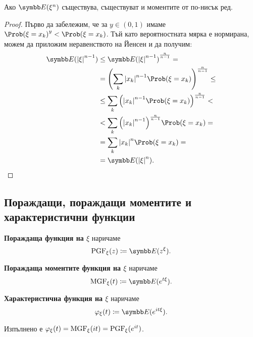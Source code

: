 \documentclass[numbers=endperiod, bibliography=totocnumbered]{scrartcl}
\begin{document}
\begin{proposition}\label{thm:lower_order_moments_exist}
  Ако \( \Expect(\xi^n) \) съществува, съществуват и моментите от по-нисък ред.
\end{proposition}
\begin{proof}
  Първо да забележим, че за \( y \in (0, 1) \) имаме \( {\Prob(\xi = x_k)}^y < \Prob(\xi = x_k) \). Тъй като вероятностната мярка е нормирана, можем да приложим неравенството на Йенсен и да получим:
  \begin{align*}
    \Expect({\Abs{\xi}}^{n-1})
    &\leq
    {\Expect({\Abs{\xi}}^{n-1})}^{\frac n {n-1}}
    = \\ &=
    {\left( \sum_k {\Abs{x_k}}^{n-1} \Prob(\xi = x_k) \right)}^{\frac n {n-1}}
    \leq \\ &\leq
    \sum_k {\left({\Abs{x_k}}^{n-1} \Prob(\xi = x_k) \right)}^{\frac n {n-1}}
    < \\ &<
    \sum_k {\left({\Abs{x_k}}^{n-1}\right)}^{\frac n {n-1}} \Prob(\xi = x_k)
    = \\ &=
    \sum_k {\Abs{x_k}}^n \Prob(\xi = x_k)
    = \\ &=
    \Expect({\Abs{\xi}}^n).
  \end{align*}
\end{proof}

\subsection{Пораждащи, пораждащи моментите и характеристични функции}

\begin{definition}
  \textbf{Пораждаща функция на \( \xi \)} наричаме
  \begin{equation*}
    \PGF_\xi (z) \coloneqq \Expect(z^\xi).
  \end{equation*}

  \textbf{Пораждаща моментите функция на \( \xi \)} наричаме
  \begin{equation*}
    \MGF_\xi (t) \coloneqq \Expect(e^{t\xi}).
  \end{equation*}

  \textbf{Характеристична функция на \( \xi \)} наричаме
  \begin{equation*}
    \Char_\xi (t) \coloneqq \Expect(e^{it\xi}).
  \end{equation*}

  Изпълнено е \( \varphi_\xi(t) = \operatorname{MGF}_\xi(it) = \operatorname{PGF}_\xi(e^{it}) \).
\end{definition}
\end{document}
